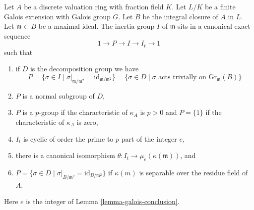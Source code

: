 \begin{lemma}
\label{lemma-galois-inertia}
Let $A$ be a discrete valuation ring with fraction field $K$.
Let $L/K$ be a finite Galois extension with Galois group $G$.
Let $B$ be the integral closure of $A$ in $L$. Let $\mathfrak m \subset B$
be a maximal ideal. The inertia group $I$ of $\mathfrak m$
sits in a canonical exact sequence
$$
1 \to P \to I \to I_t \to 1
$$
such that
\begin{enumerate}
\item if $D$ is the decomposition group we have
$$
P = \{\sigma \in I \mid \sigma|_{\mathfrak m/\mathfrak m^2} =
\text{id}_{\mathfrak m/\mathfrak m^2}\}
=
\{\sigma \in D \mid \sigma \text{ acts trivially on }\text{Gr}_\mathfrak m(B)\}
$$
\item $P$ is a normal subgroup of $D$,
\item $P$ is a $p$-group if the characteristic of $\kappa_A$ is
$p > 0$ and $P = \{1\}$ if the characteristic of $\kappa_A$ is zero,
\item $I_t$ is cyclic of order the prime to $p$ part of the integer $e$,
\item there is a canonical isomorphism
$\theta : I_t \to \mu_e(\kappa(\mathfrak m))$, and
\item
$P =
\{\sigma \in D \mid \sigma|_{B/\mathfrak m^2} = \text{id}_{B/\mathfrak m^2}\}$
if $\kappa(m)$ is separable over the residue field of $A$.
\end{enumerate}
Here $e$ is the integer of Lemma \ref{lemma-galois-conclusion}.
\end{lemma}

